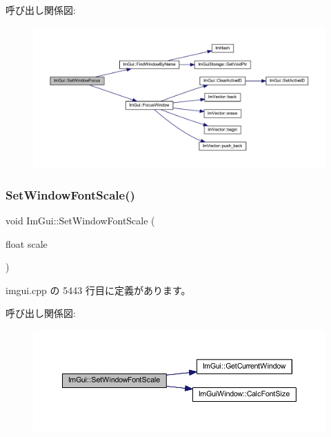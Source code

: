 呼び出し関係図\+:\nopagebreak
\begin{figure}[H]
\begin{center}
\leavevmode
\includegraphics[width=350pt]{namespace_im_gui_aa612adbb975051090898f094a1608f24_cgraph}
\end{center}
\end{figure}
\mbox{\label{namespace_im_gui_a11f2f343dbc9b00ccd9e99ebd59cfe8b}} 
\subsubsection{\texorpdfstring{Set\+Window\+Font\+Scale()}{SetWindowFontScale()}}
{\footnotesize\ttfamily void Im\+Gui\+::\+Set\+Window\+Font\+Scale (\begin{DoxyParamCaption}\item[{float}]{scale }\end{DoxyParamCaption})}



 imgui.\+cpp の 5443 行目に定義があります。

呼び出し関係図\+:\nopagebreak
\begin{figure}[H]
\begin{center}
\leavevmode
\includegraphics[width=350pt]{namespace_im_gui_a11f2f343dbc9b00ccd9e99ebd59cfe8b_cgraph}
\end{center}
\end{figure}
\mbox{\label{namespace_im_gui_aaa81e004de4c0a5cedb836e92e8aa0e5}} 

